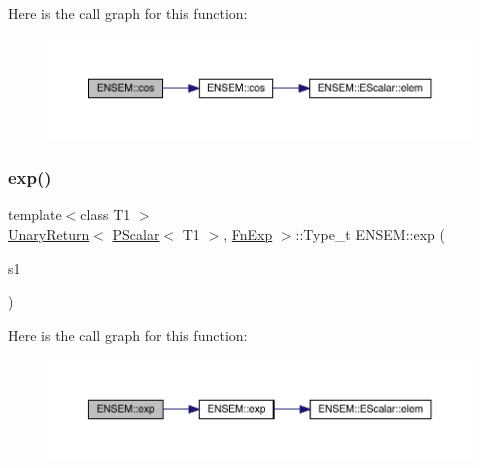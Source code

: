 Here is the call graph for this function\+:\nopagebreak
\begin{figure}[H]
\begin{center}
\leavevmode
\includegraphics[width=350pt]{db/dcc/group__primscalar_ga0d6f04344bee0fa65f96047c4c9e2fa3_cgraph}
\end{center}
\end{figure}
\mbox{\label{group__primscalar_ga82558f162d1959eca11c01ad753fc3a1}} 
\subsubsection{\texorpdfstring{exp()}{exp()}}
{\footnotesize\ttfamily template$<$class T1 $>$ \\
\mbox{\hyperlink{structENSEM_1_1UnaryReturn}{Unary\+Return}}$<$ \mbox{\hyperlink{classENSEM_1_1PScalar}{P\+Scalar}}$<$ T1 $>$, \mbox{\hyperlink{structENSEM_1_1FnExp}{Fn\+Exp}} $>$\+::Type\+\_\+t E\+N\+S\+E\+M\+::exp (\begin{DoxyParamCaption}\item[{const \mbox{\hyperlink{classENSEM_1_1PScalar}{P\+Scalar}}$<$ T1 $>$ \&}]{s1 }\end{DoxyParamCaption})\hspace{0.3cm}{\ttfamily [inline]}}

Here is the call graph for this function\+:\nopagebreak
\begin{figure}[H]
\begin{center}
\leavevmode
\includegraphics[width=350pt]{db/dcc/group__primscalar_ga82558f162d1959eca11c01ad753fc3a1_cgraph}
\end{center}
\end{figure}
\mbox{\label{group__primscalar_ga974d25e3b2bee6a839ad06b019932122}} 
